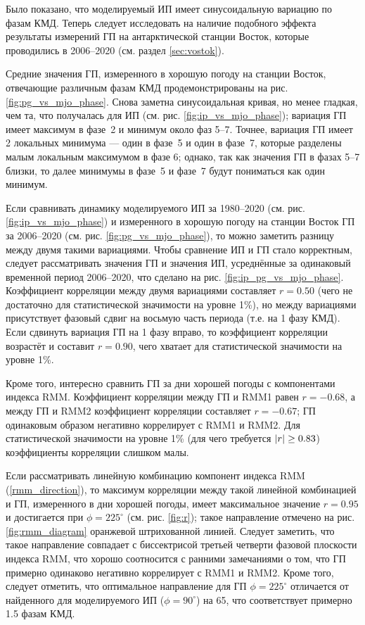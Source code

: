 
Было показано, что моделируемый ИП имеет синусоидальную вариацию по фазам КМД. Теперь следует исследовать на наличие подобного эффекта результаты измерений ГП на антарктической станции Восток, которые проводились в 2006--2020 (см. раздел \ref{sec:vostok}).

Средние значения ГП, измеренного в хорошую погоду на станции Восток, отвечающие различным фазам КМД продемонстрированы на рис. \ref{fig:pg_vs_mjo_phase}. Снова заметна синусоидальная кривая, но менее гладкая, чем та, что получалась для ИП (см. рис. \ref{fig:ip_vs_mjo_phase}); вариация ГП имеет максимум в фазе~2 и минимум около фаз 5--7. Точнее, вариация ГП имеет 2 локальных минимума --- один в фазе~5 и один в фазе~7, которые разделены малым локальным максимумом в фазе 6; однако, так как значения ГП в фазах 5--7 близки, то далее минимумы в фазе~5 и фазе~7 будут пониматься как один минимум.

Если сравнивать динамику моделируемого ИП за 1980--2020 (см. рис. \ref{fig:ip_vs_mjo_phase}) и измеренного в хорошую погоду на станции Восток ГП за 2006--2020 (см. рис. \ref{fig:pg_vs_mjo_phase}), то можно заметить разницу между двумя такими вариациями. Чтобы сравнение ИП и ГП стало корректным, следует рассматривать значения ГП и значения ИП, усреднённые за одинаковый временной период 2006--2020, что сделано на рис. \ref{fig:ip_pg_vs_mjo_phase}. Коэффициент корреляции между двумя вариациями составляет $r=0.50$ (чего не достаточно для статистической значимости на уровне 1\%), но между вариациями присутствует фазовый сдвиг на восьмую часть периода (т.е. на 1 фазу КМД). Если сдвинуть вариация ГП на 1 фазу вправо, то коэффициент корреляции возрастёт и составит $r=0.90$, чего хватает для статистической значимости на уровне 1\%.

Кроме того, интересно сравнить ГП за дни хорошей погоды с компонентами индекса RMM. Коэффициент корреляции между ГП и RMM1 равен $r=-0.68$, а между ГП и RMM2 коэффициент корреляции составляет $r=-0.67$; ГП одинаковым образом негативно коррелирует с RMM1 и RMM2. Для статистической значимости на уровне 1\% (для чего требуется $\abs{r}\ge0.83$) коэффициенты корреляции слишком малы.

Если рассматривать линейную комбинацию компонент индекса RMM (\ref{rmm_direction}), то максимум корреляции между такой линейной комбинацией и ГП, измеренного в дни хорошей погоды, имеет максимальное значение $r=0.95$ и достигается при $\phi=225^\circ$ (см. рис. \ref{fig:r}); такое направление отмечено на рис. \ref{fig:rmm_diagram} оранжевой штрихованной линией. Следует заметить, что такое направление совпадает с биссектрисой третьей четверти фазовой плоскости индекса RMM, что хорошо соотносится с ранними замечаниями о том, что ГП примерно одинаково негативно коррелирует с RMM1 и RMM2. Кроме того, следует отметить, что оптимальное направление для ГП $\phi=225^\circ$ отличается от найденного для моделируемого ИП ($\phi=90^\circ$) на 65\textdegree, что соответствует примерно 1.5 фазам КМД.


